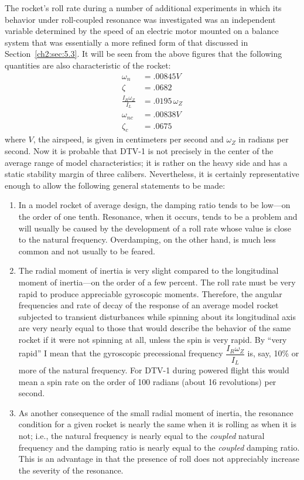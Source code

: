 The rocket's roll rate during a number of additional experiments in which its
behavior under roll-coupled resonance was investigated was an independent
variable determined by the speed of an electric motor mounted on a balance
system that was essentially a more refined form of that discussed in
Section~\ref{ch2:sec:5.3}. It will be seen from the above figures that the
following quantities are also characteristic of the rocket:
\begin{align*}
\omega_n &= .00845V \\
\zeta &= .0682 \\
\frac{I_R\omega_Z}{I_L} &= .0195\,\omega_Z \\
\omega_{nc} &= .00838V \\
\zeta_c &= .0675
\end{align*}
where $V$, the airspeed, is given in centimeters per second and $\omega_Z$ in
radians per second. Now it is probable that DTV-1 is not precisely in the
center of the average range of model characteristics; it is rather on the
heavy side and has a static stability margin of three calibers. Nevertheless,
it is certainly representative enough to allow the following general
statements to be made:
\begin{enumerate}[label=(\arabic*)]
  \item In a model rocket of average design, the damping ratio tends to be
  low---on the order of one tenth. Resonance, when it occurs, tends to be a
  problem and will usually be caused by the development of a roll rate whose
  value is close to the natural frequency. Overdamping, on the other hand, is
  much less common and not usually to be feared.
  \item The radial moment of inertia is very slight compared to the
  longitudinal moment of inertia---on the order of a few percent. The roll
  rate must be very rapid to produce appreciable gyroscopic moments.
  Therefore, the angular frequencies and rate of decay of the response of an
  average model rocket subjected to transient disturbances while spinning
  about its longitudinal axis are very nearly equal to those that would
  describe the behavior of the same rocket if it were not spinning at all,
  unless the spin is very rapid. By ``very rapid'' I mean that the gyroscopic
  precessional frequency $\dfrac{I_R\omega_Z}{I_L}$ is, say, 10\% or more of
  the natural frequency. For DTV-1 during powered flight this would mean a
  spin rate on the order of 100 radians (about 16 revolutions) per second.
  \item As another consequence of the small radial moment of inertia, the
  resonance condition for a given rocket is nearly the same when it is
  rolling as when it is not; i.e., the natural frequency is nearly equal to
  the \emph{coupled} natural frequency and the damping ratio is nearly equal
  to the \emph{coupled} damping ratio. This is an advantage in that the
  presence of roll does not appreciably increase the severity of the
  resonance.
\end{enumerate}

